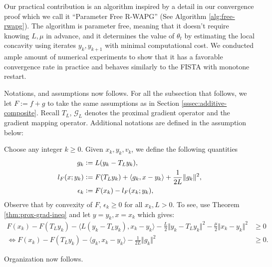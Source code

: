 \documentclass[12pt]{article}
\begin{document}
        Our practical contribution is an algorithm inspired by a detail in our convergence proof which we call it ``Parameter Free R-WAPG'' (See Algorithm \ref{alg:free-rwapg}). 
        The algorithm is parameter free, meaning that it doesn't require knowing $L, \mu$ in advance, and it determines the value of $\theta_t$ by estimating the local concavity using iterates $y_{k}, y_{k + 1}$ with minimal computational cost. 
        We conducted ample amount of numerical experiments to show that it has a favorable convergence rate in practice and behaves similarly to the FISTA with monotone restart. 
        \par
        Notations, and assumptions now follows. 
        For all the subsection that follows, we let $F:= f + g$ to take the same assumptions as in Section \ref{sssec:additive-composite}. 
        Recall $T_L$, $\mathcal G_L$ denotes the proximal gradient operator and the gradient mapping operator. 
        Additional notations are defined in the assumption below: 
        \begin{assumption}
            Choose any integer $k\ge 0$. 
            Given $x_k, y_k, v_k$, we define the following quantities
            \begin{align}
                g_k &\vcentcolon= L(y_k - T_L y_k), 
                \label{eqn:grad-map}
                \\
                l_F(x; y_k) &\vcentcolon= F(T_Ly_k) + \langle g_k, x - y_k\rangle + \frac{1}{2L}\Vert g_k\Vert^2, 
                \label{eqn:lower-linearization}
                \\
                \epsilon_{k} &\vcentcolon= F(x_k) - l_F(x_k; y_k), 
                \label{eqn:regret}
            \end{align}
            Observe that by convexity of $F$, $\epsilon_k \ge 0$ for all $x_k, L > 0$. 
            To see, use Theorem \ref{thm:prox-grad-ineq} and let $y = y_k, x = x_k$ which gives: 
            \begin{align*}
                F(x_k) - F(T_Ly_k)
                - \langle L(y_k - T_Ly_k),x_k - y_k \rangle
                - \frac{L}{2}\Vert y_k - T_Ly_k\Vert^2
                - \frac{\mu}{2}\Vert x_k - y_k\Vert^2
                &\ge 0
                \\
                \iff 
                F(x_k) - F(T_Ly_k)
                - \langle g_k,x_k - y_k \rangle
                - \frac{1}{2L}\Vert g_k\Vert^2
                &\ge 0. 
            \end{align*}
        \end{assumption}
        \par
        Organization now follows. 
\end{document}
